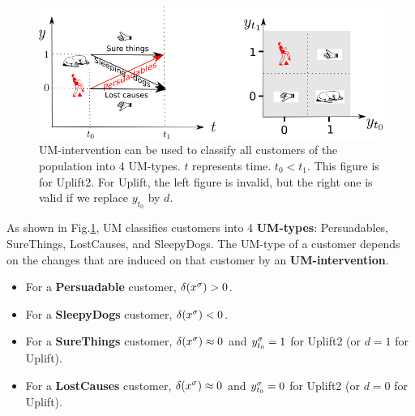 \begin{figure}[h!]
\centering
\includegraphics[width=6in]
{uplift/uplift-y-t-up.png}
\caption{UM-intervention
can be used to classify
all customers of the
population into 4 UM-types.
$t$ represents time. $t_0< t_1$.
This figure is for Uplift2. 
For Uplift, the left figure
is invalid,
but the right one is valid
if we replace $y_{t_0}$ by $d$.} 
\label{fig-uplift-y-t}
\end{figure}

As shown
in Fig.\ref{fig-uplift-y-t},
UM classifies customers
into 4 {\bf UM-types}: Persuadables, SureThings, LostCauses,
and SleepyDogs.
The UM-type
of a customer
depends on the changes 
that are induced on that customer
by an {\bf UM-intervention}.
\begin{itemize}
\item
For a {\bf Persuadable} customer,
$\delta(x^\sigma)>0$.
\item
For a {\bf SleepyDogs}
customer, $\delta(x^\sigma)< 0$.
\item
For a {\bf SureThings} customer,
 $\delta(x^\sigma)\approx 0$
and $y^\sigma_{t_0}=1$ for Uplift2
 (or $d=1$ for
Uplift).
\item
For a {\bf LostCauses} customer,
$\delta(x^\sigma)\approx 0$
and $y^\sigma_{t_0}=0$ for Uplift2
 (or $d=0$ for
Uplift).
\end{itemize}

